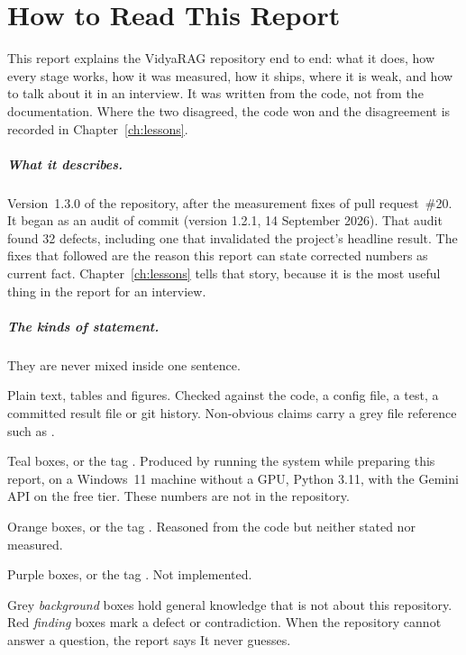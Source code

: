 \chapter*{How to Read This Report}

This report explains the VidyaRAG repository end to end: what it does, how every stage works, how it was measured, how it ships, where it is weak, and how to talk about it in an interview. It was written from the code, not from the documentation. Where the two disagreed, the code won and the disagreement is recorded in Chapter~\ref{ch:lessons}.

\paragraph{What it describes.} Version~1.3.0 of the repository, after the measurement fixes of pull request~\#20. It began as an audit of commit  (version 1.2.1, 14 September 2026). That audit found 32 defects, including one that invalidated the project's headline result. The fixes that followed are the reason this report can state corrected numbers as current fact. Chapter~\ref{ch:lessons} tells that story, because it is the most useful thing in the report for an interview.

\paragraph{The kinds of statement.} They are never mixed inside one sentence.
\begin{description}[style=sameline,leftmargin=3.4cm,font=\normalfont\bfseries]
  \item[Verified] Plain text, tables and figures. Checked against the code, a config file, a test, a committed result file or git history. Non-obvious claims carry a grey file reference such as .
  \item[Measured] Teal boxes, or the tag \tagM. Produced by running the system while preparing this report, on a Windows~11 machine without a GPU, Python 3.11, with the Gemini API on the free tier. These numbers are not in the repository.
  \item[Inferred] Orange boxes, or the tag \tagI. Reasoned from the code but neither stated nor measured.
  \item[Recommended] Purple boxes, or the tag \tagR. Not implemented.
\end{description}
Grey \emph{background} boxes hold general knowledge that is not about this repository. Red \emph{finding} boxes mark a defect or contradiction. When the repository cannot answer a question, the report says \NotDet{} It never guesses.

